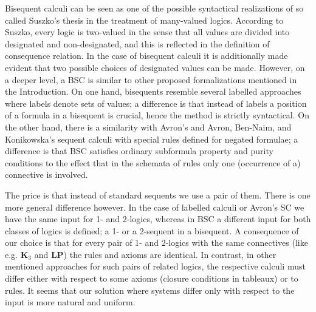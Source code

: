 \documentclass[10pt,a4paper]{article}
\theoremstyle{definition}
\newcommand{\3}{\vspace{.3in}}
\newcommand{\2}{\vspace{.2in}}
\newcommand{\1}{\vspace{.1in}}
\newcommand{\5}{\vspace{.05in}}
\begin{document}
Bisequent calculi can be seen as one of the possible syntactical realizations of so called Suszko's thesis \cite{Suszko} in the treatment of many-valued logics. According to Suszko, every logic is two-valued in the sense that all values are divided into designated and non-designated, and this is reflected in the definition of consequence relation. In the case of bisequent calculi it is additionally made evident that two possible choices of designated values can be made. However, on a deeper level, a BSC is similar to other proposed formalizations mentioned in the Introduction. On one hand, bisequents resemble several labelled approaches where labels denote sets of values; a difference is that instead of labels a position of a formula in a bisequent is crucial, hence the method is strictly syntactical. On the other hand, 
there is a similarity with Avron's \cite{Avron} and Avron, Ben-Naim, and Konikowska's \cite{Avron07} sequent calculi with special rules defined for negated formulae; a difference is that BSC satisfies ordinary subformula property and purity conditions to the effect that in the schemata of rules only one (occurrence of a) connective is involved.  

The price is that instead of standard sequents we use a pair of them. There is one more general difference however. In the case of labelled calculi or Avron's SC we have the same input for 1- and 2-logics, whereas in BSC a different input for both classes of logics is defined; a 1- or a 2-sequent in a bisequent. A consequence of our choice is that for every pair of 1- and 2-logics with the same connectives (like e.g. {\bf K$_3$} and {\bf LP}) the rules and axioms are identical. In contrast, in other mentioned approaches for such pairs of related logics, the respective calculi must differ either with respect to some axioms (closure conditions in tableaux) or to rules. It seems that our solution where systems differ only with respect to the input is more natural and uniform.
\end{document}
